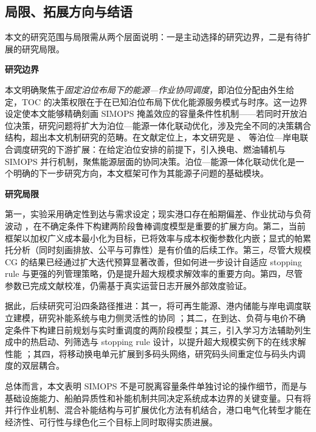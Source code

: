 \documentclass[UTF8, a4paper, 12pt]{ctexart}
\theoremstyle{plain}
\theoremstyle{definition}
\theoremstyle{remark}
\begin{document}
\subsection{局限、拓展方向与结语}
\label{sec:limitations}

本文的研究范围与局限需从两个层面说明：一是主动选择的研究边界，二是有待扩展的研究局限。

\textbf{研究边界}

本文明确聚焦于\emph{固定泊位布局下的能源—作业协同调度}，即泊位分配由外生给定，TOC 的决策权限在于在已知泊位布局下优化能源服务模式与时序。这一边界设定使本文能够精确刻画 SIMOPS 掩盖效应的容量条件性机制——若同时开放泊位决策，研究问题将扩大为泊位—能源一体化联动优化，涉及完全不同的决策耦合结构，超出本文机制研究的范畴。在文献定位上，本文研究是 \citet{Peng2021}、\citet{Iris2019} 等泊位—岸电联合调度研究的下游扩展：在给定泊位安排的前提下，引入换电、燃油辅机与 SIMOPS 并行机制，聚焦能源层面的协同决策。泊位—能源一体化联动优化是一个明确的下一步研究方向，本文框架可作为其能源子问题的基础模块。

\textbf{研究局限}

第一，实验采用确定性到达与需求设定；现实港口存在船期偏差、作业扰动与负荷波动 \citep{UNCTAD2021}，在不确定条件下构建两阶段鲁棒调度模型是重要的扩展方向。第二，当前框架以加权广义成本最小化为目标，已将效率与成本权衡参数化内嵌；显式的帕累托分析（同时刻画排放、公平与可靠性）是有价值的后续工作。第三，尽管大规模 CG 的结果已经通过扩大迭代预算显著改善，但如何进一步设计自适应 stopping rule 与更强的列管理策略，仍是提升超大规模求解效率的重要方向。第四，尽管参数已完成文献校准，仍需基于真实运营日志开展外部效度验证。

据此，后续研究可沿四条路径推进：其一，将可再生能源、港内储能与岸电调度联立建模，研究补能系统与电力侧灵活性的协同 \cite{Li2022_BSS}；其二，在到达、负荷与电价不确定条件下构建日前规划与实时重调度的两阶段模型；其三，引入学习方法辅助列生成中的热启动、列筛选与 stopping rule 设计，以提升超大规模实例下的在线求解性能 \cite{Bengio2021}；其四，将移动换电单元扩展到多码头网络，研究码头间重定位与码头内调度的双层耦合。

总体而言，本文表明 SIMOPS 不是可脱离容量条件单独讨论的操作细节，而是与基础设施能力、船舶异质性和补能机制共同决定系统成本边界的关键变量。只有将并行作业机制、混合补能结构与可扩展优化方法有机结合，港口电气化转型才能在经济性、可行性与绿色化三个目标上同时取得实质进展。

\FloatBarrier


\end{document}
